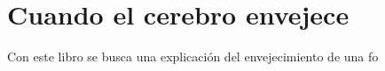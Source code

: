 \documentclass[12pt]{article}
\begin{document}
\section{Cuando el cerebro envejece}
	Con este libro se busca una explicación del envejecimiento de una fo
\end{document}
